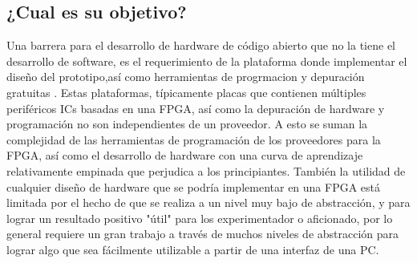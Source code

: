  
	\subsection{¿Cual es su objetivo? }


Una barrera para el desarrollo de hardware de código abierto que no la tiene el desarrollo de software, es el requerimiento de la plataforma donde implementar el diseño del prototipo,así como herramientas  de progrmacion y depuración gratuitas . Estas plataformas, típicamente placas que contienen múltiples periféricos ICs basadas en una FPGA, así como la depuración de hardware y programación no son independientes de un proveedor. A esto se suman la complejidad de las herramientas de programación de los proveedores para la FPGA, así como el desarrollo de hardware con una curva de aprendizaje relativamente empinada que perjudica a los principiantes.
También  la utilidad de cualquier diseño de hardware que se podría implementar en una FPGA está limitada por el hecho de que se realiza a un nivel muy bajo de abstracción, y para lograr un resultado positivo "útil" para los experimentador o aficionado, por lo general requiere un gran trabajo a través de muchos niveles de abstracción para lograr algo que sea fácilmente utilizable a partir de una interfaz de una PC. 

